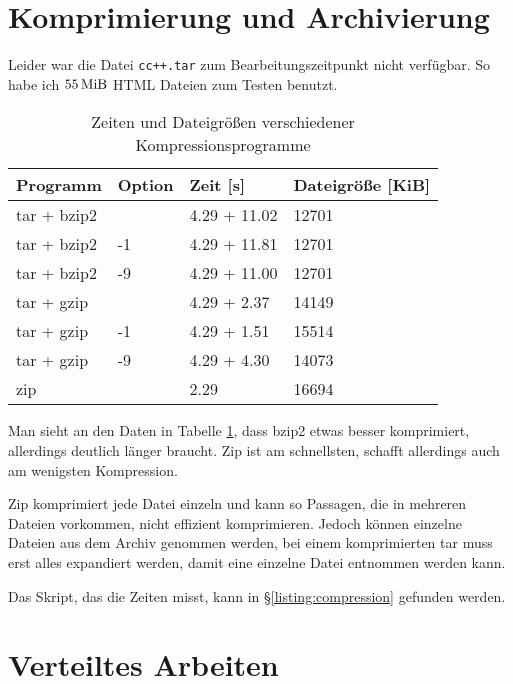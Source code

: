 


\section{Komprimierung und Archivierung}

Leider war die Datei \texttt{cc++.tar} zum Bearbeitungszeitpunkt nicht verfügbar. So habe ich $\unit[55]{MiB}$ HTML Dateien zum Testen benutzt.

\begin{table}[h!]
\begin{center}
\begin{tabular}{llll}
\label{table:compression-results}
Programm & Option & Zeit [s] & Dateigröße [KiB] \\
\hline
tar + bzip2 &  & 4.29 + 11.02 & 12701 \\
tar + bzip2 & -1 & 4.29 + 11.81 & 12701 \\
tar + bzip2 & -9 & 4.29 + 11.00 & 12701 \\
tar + gzip &  & 4.29 + 2.37 & 14149 \\
tar + gzip & -1 & 4.29 + 1.51 & 15514 \\
tar + gzip & -9 & 4.29 + 4.30 & 14073 \\
zip &  & 2.29 & 16694\\
\end{tabular}
\end{center}
\caption{Zeiten und Dateigrößen verschiedener Kompressionsprogramme}
\end{table}

Man sieht an den Daten in Tabelle \ref{table:compression-results}, dass bzip2 etwas besser komprimiert, allerdings deutlich länger braucht. Zip ist am schnellsten, schafft allerdings auch am wenigsten Kompression.

Zip komprimiert jede Datei einzeln und kann so Passagen, die in mehreren Dateien vorkommen, nicht effizient komprimieren. Jedoch können einzelne Dateien aus dem Archiv genommen werden, bei einem komprimierten tar muss erst alles expandiert werden, damit eine einzelne Datei entnommen werden kann.

Das Skript, das die Zeiten misst, kann in §\ref{listing:compression} gefunden werden.


\section{Verteiltes Arbeiten}

